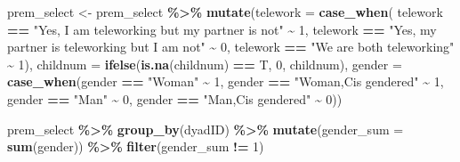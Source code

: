 \documentclass[
]{article}
\newenvironment{Shaded}{\begin{snugshade}}{\end{snugshade}}
\newcommand{\DataTypeTok}[1]{\textcolor[rgb]{0.13,0.29,0.53}{#1}}
\newcommand{\DecValTok}[1]{\textcolor[rgb]{0.00,0.00,0.81}{#1}}
\newcommand{\KeywordTok}[1]{\textcolor[rgb]{0.13,0.29,0.53}{\textbf{#1}}}
\newcommand{\NormalTok}[1]{#1}
\newcommand{\OperatorTok}[1]{\textcolor[rgb]{0.81,0.36,0.00}{\textbf{#1}}}
\newcommand{\StringTok}[1]{\textcolor[rgb]{0.31,0.60,0.02}{#1}}
\begin{document}
\begin{Shaded}
\begin{Highlighting}[]
\NormalTok{prem\_select \textless{}{-}}\StringTok{ }\NormalTok{prem\_select }\OperatorTok{\%\textgreater{}\%}
\StringTok{  }\KeywordTok{mutate}\NormalTok{(}\DataTypeTok{telework =} \KeywordTok{case\_when}\NormalTok{(}
\NormalTok{    telework }\OperatorTok{==}\StringTok{ "Yes, I am teleworking but my partner is not"} \OperatorTok{\textasciitilde{}}\StringTok{ }\DecValTok{1}\NormalTok{,}
\NormalTok{    telework }\OperatorTok{==}\StringTok{ "Yes, my partner is teleworking but I am not"} \OperatorTok{\textasciitilde{}}\StringTok{ }\DecValTok{0}\NormalTok{,}
\NormalTok{    telework }\OperatorTok{==}\StringTok{ "We are both teleworking"} \OperatorTok{\textasciitilde{}}\StringTok{ }\DecValTok{1}\NormalTok{),}
    \DataTypeTok{childnum =} \KeywordTok{ifelse}\NormalTok{(}\KeywordTok{is.na}\NormalTok{(childnum) }\OperatorTok{==}\StringTok{ }\NormalTok{T, }\DecValTok{0}\NormalTok{, childnum),}
    \DataTypeTok{gender =} \KeywordTok{case\_when}\NormalTok{(gender }\OperatorTok{==}\StringTok{ "Woman"} \OperatorTok{\textasciitilde{}}\StringTok{ }\DecValTok{1}\NormalTok{,}
\NormalTok{                       gender }\OperatorTok{==}\StringTok{ "Woman,Cis gendered"} \OperatorTok{\textasciitilde{}}\StringTok{ }\DecValTok{1}\NormalTok{,}
\NormalTok{                       gender }\OperatorTok{==}\StringTok{ "Man"} \OperatorTok{\textasciitilde{}}\StringTok{ }\DecValTok{0}\NormalTok{,}
\NormalTok{                       gender }\OperatorTok{==}\StringTok{ "Man,Cis gendered"} \OperatorTok{\textasciitilde{}}\StringTok{ }\DecValTok{0}\NormalTok{))}
\end{Highlighting}
\end{Shaded}

\begin{Shaded}
\begin{Highlighting}[]
\NormalTok{prem\_select }\OperatorTok{\%\textgreater{}\%}
\StringTok{  }\KeywordTok{group\_by}\NormalTok{(dyadID) }\OperatorTok{\%\textgreater{}\%}
\StringTok{  }\KeywordTok{mutate}\NormalTok{(}\DataTypeTok{gender\_sum =} \KeywordTok{sum}\NormalTok{(gender)) }\OperatorTok{\%\textgreater{}\%}
\StringTok{  }\KeywordTok{filter}\NormalTok{(gender\_sum }\OperatorTok{!=}\StringTok{ }\DecValTok{1}\NormalTok{)}
\end{Highlighting}
\end{Shaded}
\end{document}
